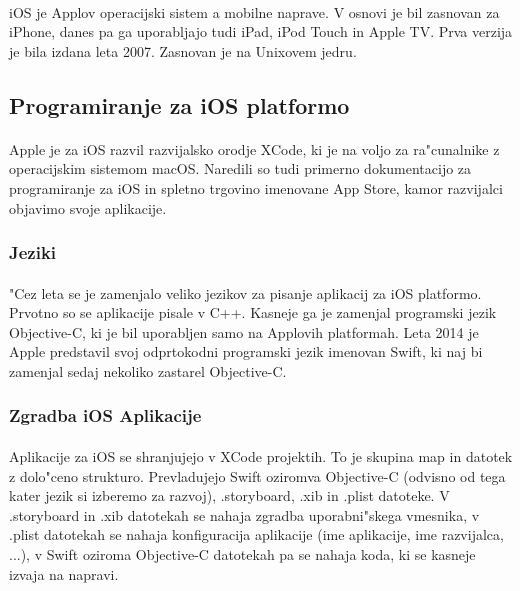 \paragraph{}iOS je Applov operacijski sistem a mobilne naprave. V osnovi je bil zasnovan za iPhone, danes pa ga uporabljajo tudi iPad, iPod Touch in Apple TV. Prva verzija je bila izdana leta 2007. Zasnovan je na Unixovem jedru.

\subsection{Programiranje za iOS platformo}
\paragraph{}Apple je za iOS razvil razvijalsko orodje XCode, ki je na voljo za ra"cunalnike z operacijskim sistemom macOS. Naredili so tudi primerno dokumentacijo\cite{ios-docs} za programiranje za iOS in spletno trgovino imenovane App Store, kamor razvijalci objavimo svoje aplikacije.

\subsubsection{Jeziki}
\paragraph{}"Cez leta se je zamenjalo veliko jezikov za pisanje aplikacij za iOS platformo. Prvotno so se aplikacije pisale v C++. Kasneje ga je zamenjal programski jezik Objective-C, ki je bil uporabljen samo na Applovih platformah. Leta 2014 je Apple predstavil svoj odprtokodni programski jezik imenovan Swift, ki naj bi zamenjal sedaj nekoliko zastarel Objective-C.

\subsubsection{Zgradba iOS Aplikacije}
\paragraph{}Aplikacije za iOS se shranjujejo v XCode projektih. To je skupina map in datotek z dolo"ceno strukturo. Prevladujejo Swift oziromva Objective-C (odvisno od tega kater jezik si izberemo za razvoj), .storyboard, .xib in .plist datoteke. V .storyboard in .xib datotekah se nahaja zgradba uporabni"skega vmesnika, v .plist datotekah se nahaja konfiguracija aplikacije (ime aplikacije, ime razvijalca, ...), v Swift oziroma Objective-C datotekah pa se nahaja koda, ki se kasneje izvaja na napravi.	

